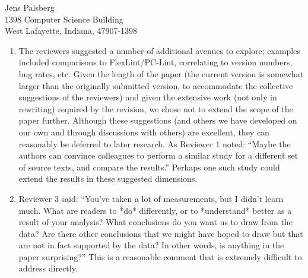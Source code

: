 \documentclass[11pt]{letter}
\begin{document}
\begin{letter}{Jens Palsberg \\
    1398 Computer Science Building \\
    West Lafayette, Indiana, 47907-1398}
\begin{enumerate}
\item
  The reviewers suggested a number of additional avenues to explore;
  examples included comparisons to FlexLint/PC-Lint, correlating to version
  numbers, bug rates, etc.  Given the length of the paper (the current
  version is somewhat larger than the originally submitted version, to
  accommodate the collective suggestions of the reviewers) and given the
  extensive work (not only in rewriting) required by the revision, we chose
  not to extend the scope of the paper further.  Although these suggestions
  (and others we have developed on our own and through discussions with
  others) are excellent, they can reasonably be deferred to later research.
  As Reviewer 1 noted: ``Maybe the authors can convince colleagues to
  perform a similar study for a different set of source texts, and compare
  the results.''  Perhaps one such study could extend the results in these
  suggested dimensions.

\item
  Reviewer 3 said: ``You've taken a lot of measurements, but I didn't learn
  much.  What are readers to *do* differently, or to *understand* better as
  a result of your analysis?  What conclusions do you want us to draw from
  the data?  Are there other conclusions that we might have hoped to draw
  but that are not in fact supported by the data?  In other words, is
  anything in the paper surprising?''  This is a reasonable comment that is
  extremely difficult to address directly.


\end{enumerate}
\end{letter}
\end{document}
